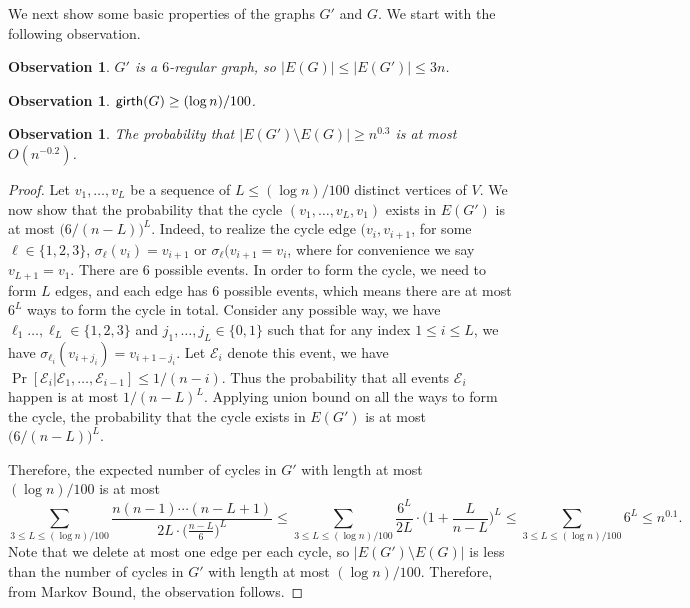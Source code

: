 \documentclass[11pt]{article}
\newtheorem{observation}[theorem]{Observation}
\theoremstyle{definition}
\newcommand{\gir}{\textnormal{\textsf{girth}}}
\newcounter{note}
\newcommand{\znote}[1]{\refstepcounter{note}$\ll${\bf ZT~\thenote:}
	{\sf \color{red} #1}$\gg$\marginpar{\tiny\bf ZT~\thenote}}
\begin{document}

We next show some basic properties of the graphs $G'$ and $G$. We start with the following observation.

\begin{observation}
$G'$ is a $6$-regular graph, so $|E(G)|\le |E(G')|\le 3n$.
\end{observation}

\begin{observation}
\label{obs: girth}
$\gir(G)\ge (\log n)/100$.
\end{observation}

\begin{observation}
The probability that $|E(G')\setminus E(G)|\ge n^{0.3}$ is at most $O(n^{-0.2})$.
\end{observation}
\begin{proof}
    Let $v_1,\ldots,v_L$ be a sequence of $L\le (\log n)/100$ distinct vertices of $V$. We now show that the probability that the cycle $(v_1,\ldots,v_L,v_1)$ exists in $E(G')$ is at most $\big(6/(n-L)\big)^{L}$. Indeed, to realize the cycle edge $(v_i,v_{i+1}$, for some $\ell \in \{1,2,3\}$, $\sigma_{\ell}(v_i)=v_{i+1}$ or $\sigma_{\ell}(v_{i+1}=v_i$, where for convenience we say $v_{L+1} = v_1$. There are $6$ possible events. In order to form the cycle, we need to form $L$ edges, and each edge has $6$ possible events, which means there are at most $6^L$ ways to form the cycle in total. Consider any possible way, we have $\ell_1 \dots, \ell_{L} \in \{1,2,3\}$ and $j_1, \dots, j_L \in \{0,1\}$ such that for any index $1 \le i \le L$, we have $\sigma_{\ell_i}(v_{i+j_i})=v_{i+1-j_i}$. Let $\mathcal{E}_i$ denote this event, we have $\Pr[\mathcal{E}_i | \mathcal{E}_1 , \dots, \mathcal{E}_{i-1}] \le 1/(n-i)$. Thus the probability that all events $\mathcal{E}_i$ happen is at most $1/(n-L)^L$. Applying union bound on all the ways to form the cycle, the probability that the cycle exists in $E(G')$ is at most $\big(6/(n-L)\big)^L$.


Therefore, the expected number of cycles in $G'$ with length at most $(\log n)/100$ is at most 
\[\sum_{3\le L\le (\log n)/100} \frac{n(n-1)\cdots (n-L+1)}{2L\cdot \big(\frac{n-L}{6}\big)^{L}}\le \sum_{3\le L\le (\log n)/100} \frac{6^L}{2L}\cdot \bigg(1+\frac{L}{n-L}\bigg)^{L}\le \sum_{3\le L\le (\log n)/100} 6^L\le n^{0.1}. \]
Note that we delete at most one edge per each cycle, so $|E(G')\setminus E(G)|$ is less than the number of cycles in $G'$ with length at most $(\log n)/100$. Therefore, from Markov Bound, the observation follows.
\end{proof}
\end{document}
